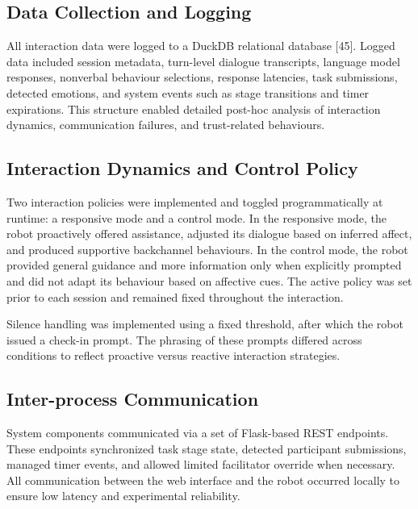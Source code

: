 \documentclass[
  letterpaper,
  DIV=11,
  numbers=noendperiod]{scrartcl}
\begin{document}
\subsection{Data Collection and
Logging}\label{data-collection-and-logging}

All interaction data were logged to a DuckDB relational database
{[}45{]}. Logged data included session metadata, turn-level dialogue
transcripts, language model responses, nonverbal behaviour selections,
response latencies, task submissions, detected emotions, and system
events such as stage transitions and timer expirations. This structure
enabled detailed post-hoc analysis of interaction dynamics,
communication failures, and trust-related behaviours.

\subsection{Interaction Dynamics and Control
Policy}\label{interaction-dynamics-and-control-policy}

Two interaction policies were implemented and toggled programmatically
at runtime: a responsive mode and a control mode. In the responsive
mode, the robot proactively offered assistance, adjusted its dialogue
based on inferred affect, and produced supportive backchannel
behaviours. In the control mode, the robot provided general guidance and
more information only when explicitly prompted and did not adapt its
behaviour based on affective cues. The active policy was set prior to
each session and remained fixed throughout the interaction.

Silence handling was implemented using a fixed threshold, after which
the robot issued a check-in prompt. The phrasing of these prompts
differed across conditions to reflect proactive versus reactive
interaction strategies.

\subsection{Inter-process
Communication}\label{inter-process-communication}

System components communicated via a set of Flask-based REST endpoints.
These endpoints synchronized task stage state, detected participant
submissions, managed timer events, and allowed limited facilitator
override when necessary. All communication between the web interface and
the robot occurred locally to ensure low latency and experimental
reliability.
\end{document}
